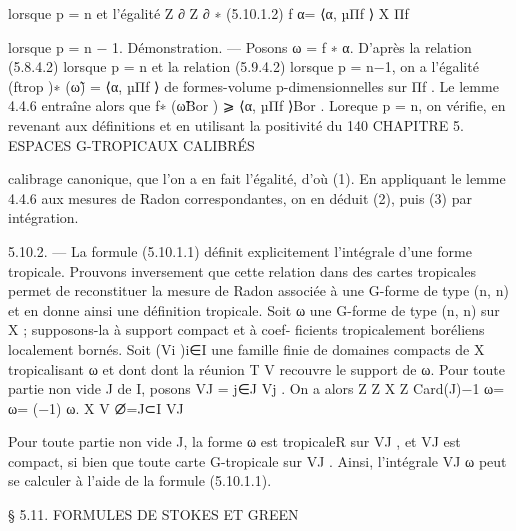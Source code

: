 \documentclass[
  10pt,
]{article}
\newenvironment{Shaded}{}{}
\newcommand{\NormalTok}[1]{#1}
\begin{document}
\begin{Shaded}
\begin{Highlighting}[]
\NormalTok{lorsque p = n et l’égalité}
\NormalTok{                                      Z ∂          Z ∂}
\NormalTok{                                            ∗}
\NormalTok{(5.10.1.2)                                  f α=         ⟨α, µΠf ⟩}
\NormalTok{                                        X           Πf}

\NormalTok{lorsque p = n − 1.}
\NormalTok{Démonstration. — Posons ω = f ∗ α. D’après la relation (5.8.4.2) lorsque p = n et la}
\NormalTok{relation (5.9.4.2) lorsque p = n−1, on a l’égalité (ftrop )∗ (ω̃) = ⟨α, µΠf ⟩ de formes{-}volume}
\NormalTok{p{-}dimensionnelles sur Πf . Le lemme 4.4.6 entraîne alors que f∗ (ω̃Bor ) ⩾ ⟨α, µΠf ⟩Bor .}
\NormalTok{Loreque p = n, on vérifie, en revenant aux définitions et en utilisant la positivité du}
\NormalTok{140                   CHAPITRE 5. ESPACES G{-}TROPICAUX CALIBRÉS}

\NormalTok{calibrage canonique, que l’on a en fait l’égalité, d’où (1). En appliquant le lemme 4.4.6}
\NormalTok{aux mesures de Radon correspondantes, on en déduit (2), puis (3) par intégration.}

\NormalTok{5.10.2. — La formule (5.10.1.1) définit explicitement l’intégrale d’une forme tropicale.}
\NormalTok{Prouvons inversement que cette relation dans des cartes tropicales permet de reconstituer}
\NormalTok{la mesure de Radon associée à une G{-}forme de type (n, n) et en donne ainsi une définition}
\NormalTok{tropicale.}
\NormalTok{   Soit ω une G{-}forme de type (n, n) sur X ; supposons{-}la à support compact et à coef{-}}
\NormalTok{ficients tropicalement boréliens localement bornés.}
\NormalTok{   Soit (Vi )i∈I une famille finie de domaines compacts de X tropicalisant ω et dont dont}
\NormalTok{la réunion}
\NormalTok{      T       V recouvre le support de ω. Pour toute partie non vide J de I, posons}
\NormalTok{VJ = j∈J Vj . On a alors}
\NormalTok{                          Z        Z       X                  Z}
\NormalTok{                                                    Card(J)−1}
\NormalTok{                              ω=       ω=       (−1)            ω.}
\NormalTok{                          X       V       ∅̸=J⊂I              VJ}

\NormalTok{Pour toute partie non vide J, la forme ω est tropicaleR sur VJ , et VJ est compact, si bien}
\NormalTok{que toute carte G{-}tropicale sur VJ . Ainsi, l’intégrale VJ ω peut se calculer à l’aide de la}
\NormalTok{formule (5.10.1.1).}



\NormalTok{                 § 5.11. FORMULES DE STOKES ET GREEN}


\end{Highlighting}
\end{Shaded}
\end{document}
